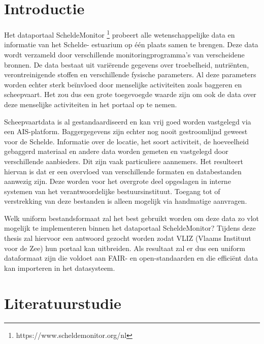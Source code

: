 
\section{Introductie}%
\label{sec:introductie}

Het dataportaal ScheldeMonitor \footnote{https://www.scheldemonitor.org/nl} probeert alle wetenschappelijke data en informatie van het 
Schelde- estuarium op één plaats samen te brengen. Deze data wordt verzameld door verschillende monitoringprogramma's van verscheidene bronnen. De data bestaat uit variërende gegevens over troebelheid, nutriënten, verontreinigende stoffen en verschillende fysische parameters. Al deze parameters worden echter sterk beïnvloed door menselijke activiteiten zoals baggeren en scheepvaart. Het zou dus een grote toegevoegde waarde zijn om ook de data over deze menselijke activiteiten in het portaal op te nemen.

Scheepvaartdata is al gestandaardiseerd en kan vrij goed worden vastgelegd via een AIS-platform. Baggergegevens zijn echter nog nooit gestroomlijnd geweest voor de Schelde. Informatie over de locatie, het soort activiteit, de hoeveelheid gebaggerd materiaal en andere data worden gemeten en vastgelegd door verschillende aanbieders. Dit zijn vaak particuliere aannemers. Het resulteert hiervan is dat er een overvloed van verschillende formaten en databestanden aanwezig zijn. Deze worden voor het overgrote deel opgeslagen in interne systemen van het verantwoordelijke bestuursinstituut. Toegang tot of verstrekking van deze bestanden is alleen mogelijk via handmatige aanvragen.

Welk uniform bestandsformaat zal het best gebruikt worden om deze data zo vlot mogelijk te implementeren binnen het dataportaal ScheldeMonitor? Tijdens deze thesis zal hiervoor een antwoord gezocht worden zodat VLIZ (Vlaams Instituut voor de Zee) hun portaal kan uitbreiden. Als resultaat zal er dus een uniform dataformaat zijn die voldoet aan FAIR- en open-standaarden en die efficiënt data kan importeren in het datasysteem.


\section{Literatuurstudie}%
\label{sec:state-of-the-art}

